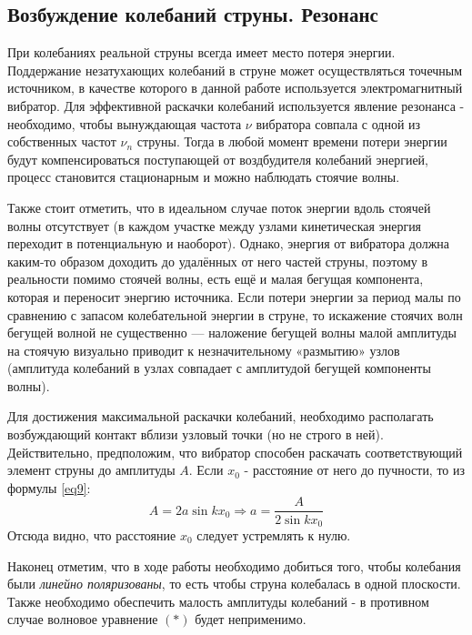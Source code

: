 \subsection{Возбуждение колебаний струны. Резонанс} При колебаниях реальной струны всегда имеет место потеря энергии. Поддержание незатухающих
колебаний в струне может осуществляться точечным источником, в качестве которого в данной работе используется электромагнитный вибратор. 
Для эффективной раскачки колебаний используется явление резонанса - необходимо, чтобы вынуждающая частота $\nu$ вибратора совпала с одной из собственных частот $\nu_n$ струны. Тогда в любой момент времени потери энергии будут компенсироваться поступающей от воздбудителя колебаний энергией, процесс становится стационарным и можно наблюдать стоячие волны.

\noindent
Также стоит отметить, что в идеальном случае поток энергии вдоль стоячей волны отсутствует (в каждом участке между узлами кинетическая энергия переходит в потенциальную и наоборот). Однако, энергия от вибратора должна каким-то образом доходить до удалённых от него частей струны, поэтому в реальности помимо стоячей волны, есть ещё и малая бегущая компонента, которая и переносит энергию источника. Если потери энергии за период малы по сравнению с запасом колебательной энергии в струне, то искажение стоячих волн бегущей волной не существенно — наложение бегущей волны малой амплитуды на стоячую визуально приводит к незначительному «размытию» узлов (амплитуда колебаний в узлах совпадает с амплитудой бегущей компоненты волны).

\noindent
Для достижения максимальной раскачки колебаний, необходимо располагать возбуждающий контакт вблизи узловый точки (но не строго в ней). Действительно, предположим, что вибратор способен раскачать соответствующий элемент струны до амплитуды $A$. Если $x_0$ - расстояние от него до пучности, то из формулы \eqref{eq9}:
\[A = 2a \sin{kx_0} \Rightarrow a = \frac{A}{2\sin{kx_0}} \]
Отсюда видно, что расстояние $x_0$ следует устремлять к нулю.

\noindent
Наконец отметим, что в ходе работы необходимо добиться того, чтобы колебания были \textit{линейно поляризованы}, то есть чтобы струна колебалась в одной плоскости. Также необходимо обеспечить малость амплитуды колебаний - в противном случае волновое уравнение $(*)$ будет неприменимо.

